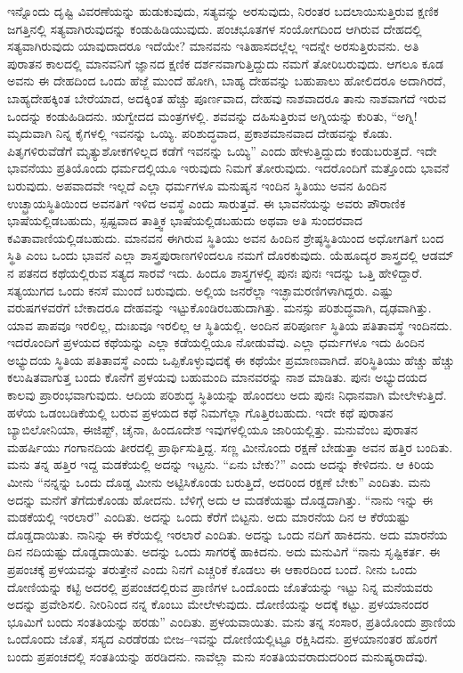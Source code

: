 ಇನ್ನೊಂದು ದೃಷ್ಟಿ ವಿವರಣೆಯನ್ನು ಹುಡುಕುವುದು, ಸತ್ಯವನ್ನು ಅರಸುವುದು, ನಿರಂತರ ಬದಲಾಯಿಸುತ್ತಿರುವ ಕ್ಷಣಿಕ ಜಗತ್ತಿನಲ್ಲಿ ಸತ್ಯವಾಗಿರುವುದನ್ನು ಕಂಡುಹಿಡಿಯುವುದು. ಪಂಚಭೂತಗಳ ಸಂಯೋಗದಿಂದ ಆಗಿರುವ ದೇಹದಲ್ಲಿ ಸತ್ಯವಾಗಿರುವುದು ಯಾವುದಾದರೂ ಇದೆಯೇ? ಮಾನವನು ಇತಿಹಾಸದಲ್ಲೆಲ್ಲ ಇದನ್ನೇ ಅರಸುತ್ತಿರುವನು. ಅತಿ ಪುರಾತನ ಕಾಲದಲ್ಲಿ ಮಾನವನಿಗೆ ಜ್ಞಾನದ ಕ್ಷಣಿಕ ದರ್ಶನವಾಗುತ್ತಿದ್ದುದು ನಮಗೆ ತೋರಿಬರುವುದು. ಆಗಲೂ ಕೂಡ ಅವನು ಈ ದೇಹದಿಂದ ಒಂದು ಹೆಜ್ಜೆ ಮುಂದೆ ಹೋಗಿ, ಬಾಹ್ಯ ದೇಹವನ್ನು ಬಹುಪಾಲು ಹೋಲಿದರೂ ಅದಾಗಿರದೆ, ಬಾಹ್ಯದೇಹಕ್ಕಿಂತ ಬೇರೆಯಾದ, ಅದಕ್ಕಿಂತ ಹೆಚ್ಚು ಪೂರ್ಣವಾದ, ದೇಹವು ನಾಶವಾದರೂ ತಾನು ನಾಶವಾಗದೆ ಇರುವ ಒಂದನ್ನು ಕಂಡುಹಿಡಿದನು. ಋಗ್ವೇದದ ಮಂತ್ರಗಳಲ್ಲಿ. ಶವವನ್ನು ದಹಿಸುತ್ತಿರುವ ಅಗ್ನಿಯನ್ನು ಕುರಿತು, “ಅಗ್ನಿ! ಮೃದುವಾಗಿ ನಿನ್ನ ಕೈಗಳಲ್ಲಿ ಇವನನ್ನು ಒಯ್ಯಿ. ಪರಿಶುದ್ಧವಾದ, ಪ್ರಕಾಶಮಾನವಾದ ದೇಹವನ್ನು ಕೊಡು. ಪಿತೃಗಳಿರುವೆಡೆಗೆ ಮೃತ್ಯುಶೋಕಗಳಿಲ್ಲದ ಕಡೆಗೆ ಇವನನ್ನು ಒಯ್ಯಿ” ಎಂದು ಹೇಳುತ್ತಿದ್ದುದು ಕಂಡುಬರುತ್ತದೆ. ಇದೇ ಭಾವನೆಯು ಪ್ರತಿಯೊಂದು ಧರ್ಮದಲ್ಲಿಯೂ ಇರುವುದು ನಿಮಗೆ ತೋರುವುದು. ಇದರೊಂದಿಗೆ ಮತ್ತೊಂದು ಭಾವನೆ ಬರುವುದು. ಅಪವಾದವೇ ಇಲ್ಲದೆ ಎಲ್ಲಾ ಧರ್ಮಗಳೂ ಮನುಷ್ಯನ ಇಂದಿನ ಸ್ಥಿತಿಯು ಅವನ ಹಿಂದಿನ ಉಚ್ಛ್ರಾಯಸ್ಥಿತಿಯಿಂದ ಅವನತಿಗೆ ಇಳಿದ ಅವಸ್ಥೆ ಎಂದು ಸಾರುತ್ತವೆ. ಈ ಭಾವನೆಯನ್ನು ಅವರು ಪೌರಾಣಿಕ ಭಾಷೆಯಲ್ಲಿಡಬಹುದು, ಸ್ಪಷ್ಟವಾದ ತಾತ್ತ್ವಿಕ ಭಾಷೆಯಲ್ಲಿಡಬಹುದು ಅಥವಾ ಅತಿ ಸುಂದರವಾದ ಕವಿತಾವಾಣಿಯಲ್ಲಿಡಬಹುದು. ಮಾನವನ ಈಗಿರುವ ಸ್ಥಿತಿಯು ಅವನ ಹಿಂದಿನ ಶ್ರೇಷ್ಠಸ್ಥಿತಿಯಿಂದ ಅಧೋಗತಿಗೆ ಬಂದ ಸ್ಥಿತಿ ಎಂಬ ಒಂದು ಭಾವನೆ ಎಲ್ಲಾ ಶಾಸ್ತ್ರಪುರಾಣಗಳಿಂದಲೂ ನಮಗೆ ದೊರಕುವುದು. ಯೆಹೂದ್ಯರ ಶಾಸ್ತ್ರದಲ್ಲಿ ಆಡಮ್​ನ ಪತನದ ಕಥೆಯಲ್ಲಿರುವ ಸತ್ಯದ ಸಾರವೆ ಇದು. ಹಿಂದೂ ಶಾಸ್ತ್ರಗಳಲ್ಲಿ ಪುನಃ ಪುನಃ ಇದನ್ನು ಒತ್ತಿ ಹೇಳಿದ್ದಾರೆ. ಸತ್ಯಯುಗದ ಒಂದು ಕನಸೆ ಮುಂದೆ ಬರುವುದು. ಅಲ್ಲಿಯ ಜನರೆಲ್ಲಾ ಇಚ್ಛಾಮರಣಿಗಳಾಗಿದ್ದರು. ಎಷ್ಟು ವರುಷಗಳವರೆಗೆ ಬೇಕಾದರೂ ದೇಹವನ್ನು ಇಟ್ಟುಕೊಂಡಿರಬಹುದಾಗಿತ್ತು. ಮನಸ್ಸು ಪರಿಶುದ್ಧವಾಗಿ, ದೃಢವಾಗಿತ್ತು. ಯಾವ ಪಾಪವೂ ಇರಲಿಲ್ಲ, ದುಃಖವೂ ಇರಲಿಲ್ಲ ಆ ಸ್ಥಿತಿಯಲ್ಲಿ. ಅಂದಿನ ಪರಿಪೂರ್ಣ ಸ್ಥಿತಿಯ ಪತಿತಾವಸ್ಥೆ ಇಂದಿನದು. ಇದರೊಂದಿಗೆ ಪ್ರಳಯದ ಕಥೆಯನ್ನು ಎಲ್ಲಾ ಕಡೆಯಲ್ಲಿಯೂ ನೋಡುವೆವು. ಎಲ್ಲಾ ಧರ್ಮಗಳೂ ಇದು ಹಿಂದಿನ ಅಭ್ಯುದಯ ಸ್ಥಿತಿಯ ಪತಿತಾವಸ್ಥೆ ಎಂದು ಒಪ್ಪಿಕೊಳ್ಳುವುದಕ್ಕೆ ಈ ಕಥೆಯೇ ಪ್ರಮಾಣವಾಗಿದೆ. ಪರಿಸ್ಥಿತಿಯು ಹೆಚ್ಚು ಹೆಚ್ಚು ಕಲುಷಿತವಾಗುತ್ತ ಬಂದು ಕೊನೆಗೆ ಪ್ರಳಯವು ಬಹುಮಂದಿ ಮಾನವರನ್ನು ನಾಶ ಮಾಡಿತು. ಪುನಃ ಅಭ್ಯುದಯದ ಕಾಲವು ಪ್ರಾರಂಭವಾಗುವುದು. ಆದಿಯ ಪರಿಶುದ್ಧ ಸ್ಥಿತಿಯನ್ನು ಹೊಂದಲು ಅದು ಪುನಃ ನಿಧಾನವಾಗಿ ಮೇಲೇಳುತ್ತಿದೆ. ಹಳೆಯ ಒಡಂಬಡಿಕೆಯಲ್ಲಿ ಬರುವ ಪ್ರಳಯದ ಕಥೆ ನಿಮಗೆಲ್ಲಾ ಗೊತ್ತಿರಬಹುದು. ಇದೇ ಕಥೆ ಪುರಾತನ ಬ್ಯಾಬಿಲೋನಿಯಾ, ಈಜಿಪ್ಟ್​, ಚೈನಾ, ಹಿಂದೂದೇಶ ಇವುಗಳಲ್ಲಿಯೂ ಜಾರಿಯಲ್ಲಿತ್ತು. ಮನುವೆಂಬ ಪುರಾತನ ಮಹರ್ಷಿಯು ಗಂಗಾನದಿಯ ತೀರದಲ್ಲಿ ಪ್ರಾರ್ಥಿಸುತ್ತಿದ್ದ. ಸಣ್ಣ ಮೀನೊಂದು ರಕ್ಷಣೆ ಬೇಡುತ್ತಾ ಅವನ ಹತ್ತಿರ ಬಂದಿತು. ಮನು ತನ್ನ ಹತ್ತಿರ ಇದ್ದ ಮಡಕೆಯಲ್ಲಿ ಅದನ್ನು ಇಟ್ಟನು. “ಏನು ಬೇಕು?” ಎಂದು ಅದನ್ನು ಕೇಳಿದನು. ಆ ಕಿರಿಯ ಮೀನು “ನನ್ನನ್ನು ಒಂದು ದೊಡ್ಡ ಮೀನು ಅಟ್ಟಿಸಿಕೊಂಡು ಬರುತ್ತಿದೆ, ಅದರಿಂದ ರಕ್ಷಣೆ ಬೇಕು” ಎಂದಿತು. ಮನು ಅದನ್ನು ಮನೆಗೆ ತೆಗೆದುಕೊಂಡು ಹೋದನು. ಬೆಳಿಗ್ಗೆ ಅದು ಆ ಮಡಕೆಯಷ್ಟು ದೊಡ್ಡದಾಗಿತ್ತು. “ನಾನು ಇನ್ನು ಈ ಮಡಕೆಯಲ್ಲಿ ಇರಲಾರೆ” ಎಂದಿತು. ಅದನ್ನು ಒಂದು ಕೆರೆಗೆ ಬಿಟ್ಟನು. ಅದು ಮಾರನೆಯ ದಿನ ಆ ಕೆರೆಯಷ್ಟು ದೊಡ್ಡದಾಯಿತು. ನಾನಿನ್ನು ಈ ಕೆರೆಯಲ್ಲಿ ಇರಲಾರೆ ಎಂದಿತು. ಅದನ್ನು ಒಂದು ನದಿಗೆ ಹಾಕಿದನು. ಅದು ಮಾರನೆಯ ದಿನ ನದಿಯಷ್ಟು ದೊಡ್ಡದಾಯಿತು. ಅದನ್ನು ಒಂದು ಸಾಗರಕ್ಕೆ ಹಾಕಿದನು. ಅದು ಮನುವಿಗೆ “ನಾನು ಸೃಷ್ಟಿಕರ್ತ. ಈ ಪ್ರಪಂಚಕ್ಕೆ ಪ್ರಳಯವನ್ನು ತರುತ್ತೇನೆ ಎಂದು ನಿನಗೆ ಎಚ್ಚರಿಕೆ ಕೊಡಲು ಈ ಆಕಾರದಿಂದ ಬಂದೆ. ನೀನು ಒಂದು ದೋಣಿಯನ್ನು ಕಟ್ಟಿ ಅದರಲ್ಲಿ ಪ್ರಪಂಚದಲ್ಲಿರುವ ಪ್ರಾಣಿಗಳ ಒಂದೊಂದು ಜೊತೆಯನ್ನು ಇಟ್ಟು ನಿನ್ನ ಮನೆಯವರು ಅದನ್ನು ಪ್ರವೇಶಿಸಲಿ. ನೀರಿನಿಂದ ನನ್ನ ಕೊಂಬು ಮೇಲೇಳುವುದು. ದೋಣಿಯನ್ನು ಅದಕ್ಕೆ ಕಟ್ಟು. ಪ್ರಳಯಾನಂದರ ಭೂಮಿಗೆ ಬಂದು ಸಂತತಿಯನ್ನು ಹರಡು” ಎಂದಿತು. ಪ್ರಳಯವಾಯಿತು. ಮನು ತನ್ನ ಸಂಸಾರ, ಪ್ರತಿಯೊಂದು ಪ್ರಾಣಿಯ ಒಂದೊಂದು ಜೊತೆ, ಸಸ್ಯದ ಎರಡೆರಡು ಬೀಜ–ಇವನ್ನು ದೋಣಿಯಲ್ಲಿಟ್ಟೂ ರಕ್ಷಿಸಿದನು. ಪ್ರಳಯಾನಂತರ ಹೊರಗೆ ಬಂದು ಪ್ರಪಂಚದಲ್ಲಿ ಸಂತತಿಯನ್ನು ಹರಡಿದನು. ನಾವೆಲ್ಲಾ ಮನು ಸಂತತಿಯವರಾದುದರಿಂದ ಮನುಷ್ಯರಾದೆವು.

